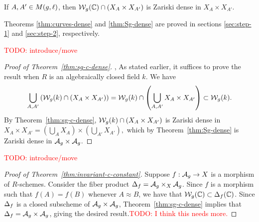 \documentclass{amsart}
\begin{document}
\begin{theorem}\label{thm:Sg-dense}
  If $A,A' \in M(g,\ell)$, then $\mathcal{W}_g(\mathbb{C}) \cap (X_A \times X_{A'})$ is Zariski dense in $X_A \times X_{A'}$.
\end{theorem}

Theorems \ref{thm:curves-dense} and \ref{thm:Sg-dense} are proved in sections \ref{sec:step-1} and \ref{sec:step-2}, respectively.

\textcolor{red}{TODO: introduce/move}

\begin{proof}[Proof of Theorem~\ref{thm:sg-c-dense}], 
As stated earlier, it suffices to prove the result when $R$ is an algebraically closed field $k$.
We have 
$$
\bigcup_{A,A'} \left(\mathcal{W}_g(k) \cap (X_A \times X_{A'})\right) =  \mathcal{W}_g(k) \cap \left(\bigcup_{A,A'} X_A \times X_{A'}\right)
   \subset \mathcal{W}_g(k).
   $$
By Theorem~\ref{thm:sg-c-dense},
$\mathcal{W}_g(k) \cap (X_A \times X_{A'})$ is Zariski dense in $X_A \times X_{A'} =
    \left(\bigcup_{A} X_A\right) \times \left(\bigcup_{A'} X_{A'}\right),$ which by Theorem~\ref{thm:Sg-dense} is Zariski dense in $\mathcal{A}_g \times \mathcal{A}_g$.
\end{proof}

\textcolor{red}{TODO: introduce/move}

\begin{proof}[Proof of Theorem~\ref{thm:invariant-c-constant}]
  Suppose $f: \mathcal{A}_g \to X$ is a morphism of $R$-schemes. Consider the fiber product $\Delta_f = \mathcal{A}_g \times_X \mathcal{A}_g$. 
Since $f$ is a morphism such that $f(A) = f(B)$ whenever $A \approx B$, we have that $\mathcal{W}_g(\mathbb{C}) \subset \Delta_f(\mathbb{C})$.
   Since $\Delta_f$ is a closed subscheme of $\mathcal{A}_g \times \mathcal{A}_g$, Theorem~\ref{thm:sg-c-dense} implies that $\Delta_f = \mathcal{A}_g \times \mathcal{A}_g$, giving the desired result.\textcolor{red}{TODO: I think this needs more.}
\end{proof}
\end{document}
